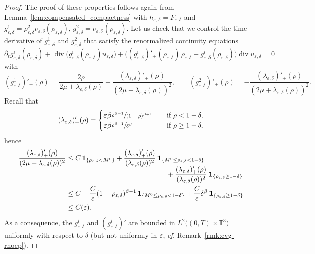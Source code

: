 \documentclass[10pt]{amsart}
\newcommand{\<}{\bigl\langle}
\renewcommand{\>}{\bigr\rangle}
\theoremstyle{definition}
\theoremstyle{remark}
\newcommand{\TT}{\mathbb{T}^3}
\DeclareMathOperator{\Div}{div}
\let\ep\varepsilon
\begin{document}
\begin{proof}
The proof of these properties follows again from Lemma~\ref{lem:compensated_compactness} with $h_{\ep,\delta} = F_{\ep,\delta}$ and $g_{\ep,\delta}^1 = \rho_{\ep,\delta}^2 \nu_{\ep,\delta}(\rho_{\ep,\delta})$, $g_{\ep,\delta}^2=\nu_{\ep,\delta}(\rho_{\ep,\delta})$.
Let us check that we control the time derivative of $g_{\ep,\delta}^1$ and $g_{\ep,\delta}^2$ that satisfy the renormalized continuity equations
\begin{equation}\label{eq:renorm_gi}
\partial_t g_{\ep,\delta}^i(\rho_{\ep,\delta}) + \Div\big(g_{\ep,\delta}^i(\rho_{\ep,\delta}) u_{\ep,\delta}\big) + \Big((g_{\ep,\delta}^i)'_+(\rho_{\ep,\delta}) \, \rho_{\ep,\delta}-g_{\ep,\delta}^i(\rho_{\ep,\delta}) \Big) \Div u_{\ep,\delta} = 0
\end{equation}
with
\[ (g_{\ep,\delta}^1)'_+(\rho) =
\dfrac{2\rho}{2\mu + \lambda_{\ep,\delta}(\rho)}-\dfrac{(\lambda_{\ep,\delta})'_+(\rho)}{(2\mu + \lambda_{\ep,\delta}(\rho))^2}, \qquad (g_{\ep,\delta}^2)'_+(\rho)
= -\dfrac{(\lambda_{\ep,\delta})'_+(\rho)}{(2\mu + \lambda_{\ep,\delta}(\rho))^2}.\]
Recall that
\[
(\lambda_{\ep,\delta})'_+(\rho) = \begin{cases}
\ep \beta \sfrac{\rho^{\beta-1}}{(1-\rho)^{\beta+1}} \quad & \text{if } \rho < 1-\delta, \\
\ep \beta \sfrac{\rho^{\beta-1}}{\delta^\beta}\quad & \text{if } \rho \geq 1-\delta, \end{cases}
\]
hence
\begin{equation}\label{eq:inegal-dep-ep}
\begin{split}
\dfrac{(\lambda_{\ep,\delta})'_+(\rho)}{(2\mu + \lambda_{\ep,\delta}(\rho))^2}
& \leq C \,\mathbf{1}_{\{ \rho_{\ep,\delta} < M^0 \}}
+ \dfrac{(\lambda_{\ep,\delta})'_+(\rho)}{(\lambda_{\ep,\delta}(\rho))^2}\,\mathbf{1}_{\{ M^0 \leq \rho_{\ep,\delta} < 1-\delta \}}\\[-5pt]
&\hspace*{5cm}+ \dfrac{(\lambda_{\ep,\delta})'_+(\rho)}{(\lambda_{\ep,\delta}(\rho))^2}\,\mathbf{1}_{\{ \rho_{\ep,\delta} \geq 1-\delta \}} \\
& \leq C + \dfrac{C}{\ep}(1-\rho_{\ep,\delta})^{\beta -1}\,\mathbf{1}_{\{ M^0 \leq \rho_{\ep,\delta} < 1-\delta \}}
+ \dfrac{C}{\ep}\delta^{\beta}\,\mathbf{1}_{\{ \rho_{\ep,\delta} \geq 1-\delta \}} \\
& \leq C(\ep).
\end{split}
\end{equation}
As a consequence, the
$g^i_{\ep,\delta}$ and $(g^i_{\ep,\delta})'$ are bounded in $L^2\big((0,T)\times \TT\big)$ uniformly with respect to $\delta$ (but not uniformly in $\ep$, {\it cf.} Remark~\ref{rmk:cvg-rhoep}).

\end{proof}
\end{document}
